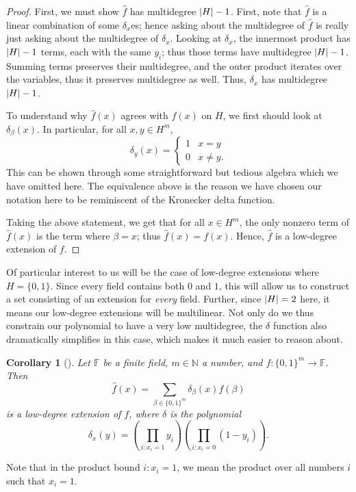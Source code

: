 \documentclass{reedthesis}
\theoremstyle{plain}
\newtheorem{cor}[thm]{Corollary}
\theoremstyle{definition}
\theoremstyle{remark}
\DeclarePairedDelimiter{\abs}{\lvert}{\rvert}
\numberwithin{equation}{section}
\begin{document}
\begin{proof}
  First, we must show $\hat{f}$ has multidegree $\abs{H} - 1$. First, note that
  $\hat{f}$ is a linear combination of some $\delta_{x}$es; hence asking about the
  multidegree of $\hat{f}$ is really just asking about the multidegree of
  $\delta_{x}$. Looking at $\delta_{x}$, the innermost product has $\abs{H} - 1$ terms,
  each with the same $y_{i}$; thus those terms have multidegree $\abs{H} - 1$.
  Summing terms preserves their multidegree, and the outer product iterates over
  the variables, thus it preserves multidegree as well. Thus, $\delta_{x}$ has
  multidegree $\abs{H} - 1$.

  To understand why $\hat{f}(x)$ agrees with $f(x)$ on $H$, we first should look
  at $\delta_{\beta}(x)$. In particular, for all $x, y \in H^{m}$,
  \begin{equation*}
    \delta_{y}(x) = \begin{cases}
      1 & x = y \\
      0 & x \ne y.
    \end{cases}
  \end{equation*}
  This can be shown through some straightforward but tedious algebra which we
  have omitted here. The equivalence above is the reason we have chosen our
  notation here to be reminiscent of the Kronecker delta function.

  Taking the above statement, we get that for all $x \in H^{m}$, the only nonzero
  term of $\hat{f}(x)$ is the term where $\beta = x$; thus $\hat{f}(x) = f(x)$.
  Hence, $\hat{f}$ is a low-degree extension of $f$.
\end{proof}

Of particular interest to us will be the case of low-degree extensions where
$H = \{0, 1\}$. Since every field contains both $0$ and $1$, this will allow us
to construct a set consisting of an extension for \emph{every} field. Further,
since $\abs{H} = 2$ here, it means our low-degree extensions will be
multilinear. Not only do we thus constrain our polynomial to have a very low
multidegree, the $\delta$ function also dramatically simplifies in this case, which
makes it much easier to reason about.

\begin{cor}[{\cite[]{AW09}}]
  Let $\mathbb{F}$ be a finite field, $m \in \mathbb{N}$ a number, and
  $f: \{0, 1\}^{m} \rightarrow \mathbb{F}$. Then
  \begin{equation}
    \hat{f}(x) = \sum_{\beta \in \{0, 1\}^{m}}\delta_{\beta}(x)f(\beta)
  \end{equation}
  is a low-degree extension of $f$, where $\delta$ is the polynomial
  \begin{equation}\label{eqn:delta-poly-small}
    \delta_{x}(y) = \left(\prod_{i:x_{i}=1}y_{i}\right)\left(\prod_{i:x_{i}=0}(1 - y_{i})\right).
  \end{equation}
\end{cor}
Note that in the product bound $i:x_{i} = 1$, we mean the product over all
numbers $i$ such that $x_{i} = 1$.
\end{document}
